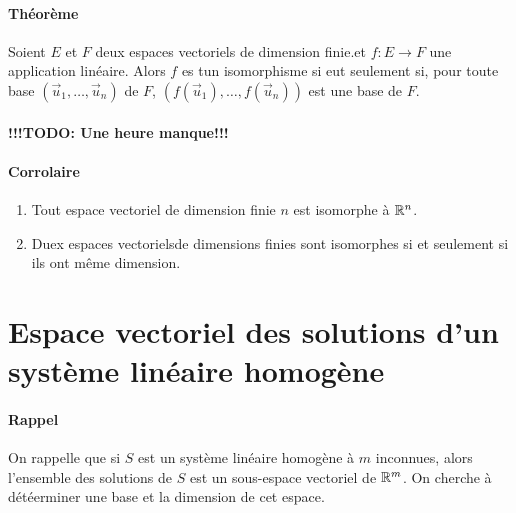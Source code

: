 \paragraph{Théorème} Soient $E$ et $F$ deux espaces vectoriels de dimension finie.et $f: E \rightarrow F$ une application linéaire. Alors $f$ es tun isomorphisme si eut seulement si, pour toute base $(\vec{u}_1, \ldots, \vec{u}_n)$ de $F$, $(f(\vec{u}_1), \ldots, f(\vec{u}_n))$ est une base de $F$.

\paragraph{!!!TODO: Une heure manque!!!}

\paragraph{Corrolaire}
\begin{enumerate}
  \item Tout espace vectoriel de dimension finie $n$ est isomorphe à $\mathbb{R}^n$.
  \item Duex espaces vectorielsde dimensions finies sont isomorphes si et seulement si ils ont même dimension.
\end{enumerate}

%
%
\section{Espace vectoriel des solutions d'un système linéaire homogène}
%
%
\paragraph{Rappel} On rappelle que si $S$ est un système linéaire homogène à $m$ inconnues, alors l'ensemble des solutions de $S$ est un sous-espace vectoriel de $\mathbb{R}^m$. On cherche à détéerminer une base et la dimension de cet espace.

